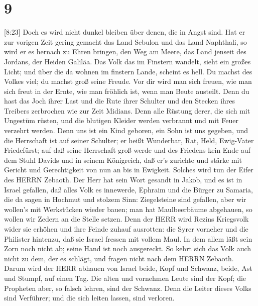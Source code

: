 \hypertarget{section-8}{%
\section{9}\label{section-8}}

 {[}8:23{]} Doch es wird nicht dunkel bleiben über denen,
die in Angst sind. Hat er zur vorigen Zeit gering gemacht das Land
Sebulon und das Land Naphthali, so wird er es hernach zu Ehren bringen,
den Weg am Meere, das Land jenseit des Jordans, der Heiden Galiläa.
 Das Volk das im Finstern wandelt, sieht ein großes Licht;
und über die da wohnen im finstern Lande, scheint es hell. 
Du machst des Volkes viel; du machst groß seine Freude. Vor dir wird man
sich freuen, wie man sich freut in der Ernte, wie man fröhlich ist, wenn
man Beute austeilt.  Denn du hast das Joch ihrer Last und
die Rute ihrer Schulter und den Stecken ihres Treibers zerbrochen wie
zur Zeit Midians.  Denn alle Rüstung derer, die sich mit
Ungestüm rüsten, und die blutigen Kleider werden verbrannt und mit Feuer
verzehrt werden.  Denn uns ist ein Kind geboren, ein Sohn
ist uns gegeben, und die Herrschaft ist auf seiner Schulter; er heißt
Wunderbar, Rat, Held, Ewig-Vater Friedefürst;  auf daß seine
Herrschaft groß werde und des Friedens kein Ende auf dem Stuhl Davids
und in seinem Königreich, daß er's zurichte und stärke mit Gericht und
Gerechtigkeit von nun an bis in Ewigkeit. Solches wird tun der Eifer des
HERRN Zebaoth.  Der Herr hat sein Wort gesandt in Jakob, und
es ist in Israel gefallen,  daß alles Volk es innewerde,
Ephraim und die Bürger zu Samaria, die da sagen in Hochmut und stolzem
Sinn:  Ziegelsteine sind gefallen, aber wir wollen's mit
Werkstücken wieder bauen; man hat Maulbeerbäume abgehauen, so wollen wir
Zedern an die Stelle setzen.  Denn der HERR wird Rezins
Kriegsvolk wider sie erhöhen und ihre Feinde zuhauf ausrotten:
 die Syrer vorneher und die Philister hintenzu, daß sie
Israel fressen mit vollem Maul. In dem allem läßt sein Zorn noch nicht
ab; seine Hand ist noch ausgereckt.  So kehrt sich das Volk
auch nicht zu dem, der es schlägt, und fragen nicht nach dem HERRN
Zebaoth.  Darum wird der HERR abhauen von Israel beide,
Kopf und Schwanz, beide, Ast und Stumpf, auf einen Tag. 
Die alten und vornehmen Leute sind der Kopf; die Propheten aber, so
falsch lehren, sind der Schwanz.  Denn die Leiter dieses
Volks sind Verführer; und die sich leiten lassen, sind verloren.
